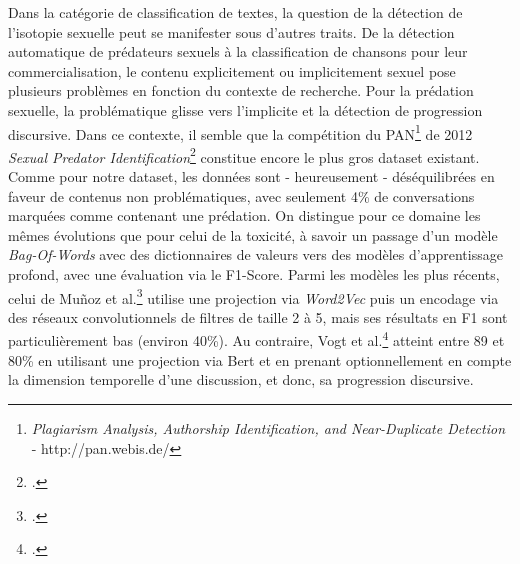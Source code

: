 Dans la catégorie de classification de textes, la question de la détection de l'isotopie sexuelle peut se manifester sous d'autres traits. De la détection automatique de prédateurs sexuels à la classification de chansons pour leur commercialisation, le contenu explicitement ou implicitement sexuel pose plusieurs problèmes en fonction du contexte de recherche. Pour la prédation sexuelle, la problématique glisse vers l'implicite et la détection de progression discursive. Dans ce contexte, il semble que la compétition du PAN\footnote{\textit{Plagiarism Analysis, Authorship Identification, and Near-Duplicate Detection} - http://pan.webis.de/} de 2012 \textit{Sexual Predator Identification}\footcite{inches_overview_2012} constitue encore le plus gros dataset existant. Comme pour notre dataset, les données sont - heureusement - déséquilibrées en faveur de contenus non problématiques, avec seulement 4\% de conversations marquées comme contenant une prédation. On distingue pour ce domaine les mêmes évolutions que pour celui de la toxicité, à savoir un passage d'un modèle \textit{Bag-Of-Words} avec des dictionnaires de valeurs vers des modèles d'apprentissage profond, avec une évaluation via le F1-Score. Parmi les modèles les plus récents, celui de Muñoz et al.\footcite{munoz_smartsec4cop_2020} utilise une projection via \textit{Word2Vec} puis un encodage via des réseaux convolutionnels de filtres de taille 2 à 5, mais ses résultats en F1 sont particulièrement bas (environ 40\%). Au contraire, Vogt et al.\footcite{vogt_early_2021} atteint entre 89 et 80\% en utilisant une projection via Bert et en prenant optionnellement en compte la dimension temporelle d'une discussion, et donc, sa progression discursive. 


